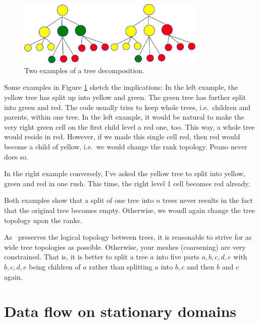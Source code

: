 \begin{figure}
  \begin{center}
    \includegraphics[width=0.8\textwidth]{51_domain-decomposition/tree-topology.pdf}
  \end{center}
  \caption{
    Two examples of a tree decomposition.
    \label{figure:51_domain-decomposition:tree-topology}
  }
\end{figure}

Some examples in Figure \ref{figure:51_domain-decomposition:tree-topology}
sketch the implications:
In the left example, the yellow tree has split up into yellow and green. The
green tree has further split into green and red.
The code usually tries to keep whole trees, i.e.~children and parents, within
one tree.
In the left example, it would be natural to make the very right green cell on
the first child level a red one, too.
This way, a whole tree would reside in red.
However, if we made this single cell red, then red would become a child of
yellow, i.e.~we would change the rank topology.
Peano never does so.

In the right example conversely, I've asked the yellow tree to split into
yellow, green and red in one rush. 
This time, the right level 1 cell becomes red already. 

Both examples show that a split of one tree into $n$ trees never
results in the fact that the original tree becomes empty.
Otherwise, we woudl again change the tree topology upon the ranks.


\begin{remark}
 As \Peano\ preserves the logical topology between trees, it is reasonable to
 strive for as wide tree topologies as possible. Otherwise, your meshes
 (coarsening) are very constrained. That is, it is better to split a tree $a$
 into five parts $a,b,c,d,e$ with $b,c,d,e$ being children of $a$ rather than
 splitting $a$ into $b,c$ and then $b$ and $c$ again.
\end{remark}


\section{Data flow on stationary domains}

